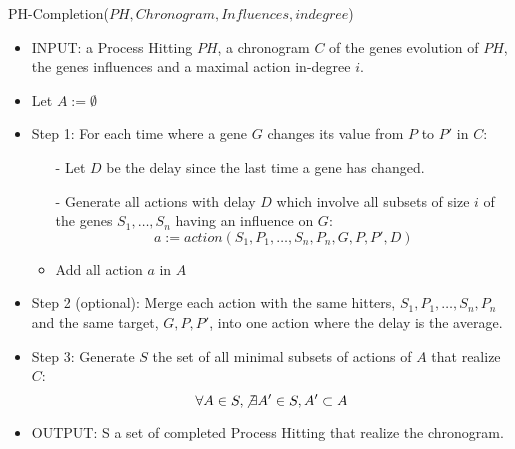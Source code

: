 \begin{algorithm}
	\caption{PH-Completion($PH,Chronogram,Influences,indegree$)}
	\label{alg:PHC_ap}
	\begin{itemize}
		\item INPUT: a Process Hitting $PH$, a chronogram $C$ of the genes evolution of $PH$, the genes influences and a maximal action in-degree $i$.

		\item Let $A := \emptyset$
		\item Step 1: For each time where a gene $G$ changes its value from $P$ to $P'$ in $C$:

		\begin{itemize}
			\item[-] Let $D$ be the delay since the last time a gene has changed.
			\item[-] Generate all actions with delay $D$ which involve all subsets of size $i$ of the genes $S_1, \ldots, S_n$ having an influence on $G$:
			$$a := action(S_1,P_1,\ldots, S_n,P_n, G, P, P', D)$$
			\item Add all action $a$ in $A$
		\end{itemize}
		
		\item Step 2 (optional): Merge each action with the same hitters, $S_1,P_1,\ldots, S_n,P_n$ and the same target, $G, P, P'$,
		into one action where the delay is the average.
		
		\item Step 3: Generate $S$ the set of all minimal subsets of actions of $A$ that realize $C$:
			$$\forall A \in S, \not \exists A' \in S, A' \subset A$$
			
		\item OUTPUT: S a set of completed Process Hitting that realize the chronogram.
	\end{itemize}
\end{algorithm}


